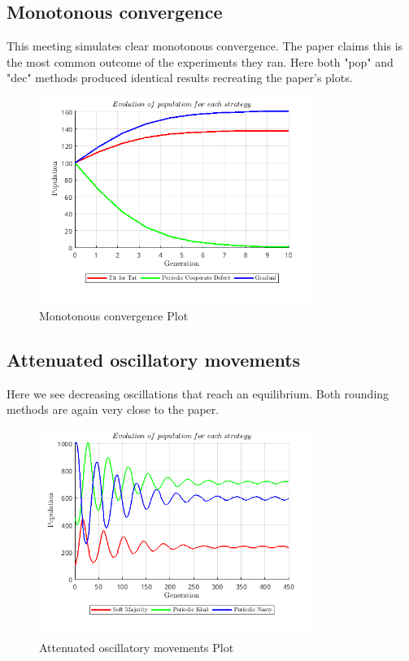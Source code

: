 \subsection{Monotonous convergence}
This meeting simulates clear monotonous convergence. The paper claims this is the most common outcome of the experiments they ran. Here both "pop" and "dec" methods produced identical results recreating the paper's plots. 
\begin{figure}[H]
    \centering
    \includegraphics[width=0.8\textwidth]{media/meetings/monotonous_convergence_dec.png}
    \caption{Monotonous convergence Plot}
\end{figure}

\subsection{Attenuated oscillatory movements}
Here we see decreasing oscillations that reach an equilibrium. Both rounding methods are again very close to the paper.
\begin{figure}[H]
    \centering
    \includegraphics[width=0.8\textwidth]{media/meetings/attenuated_oscillatory_movements_dec.png}
    \caption{Attenuated oscillatory movements Plot}
\end{figure}

